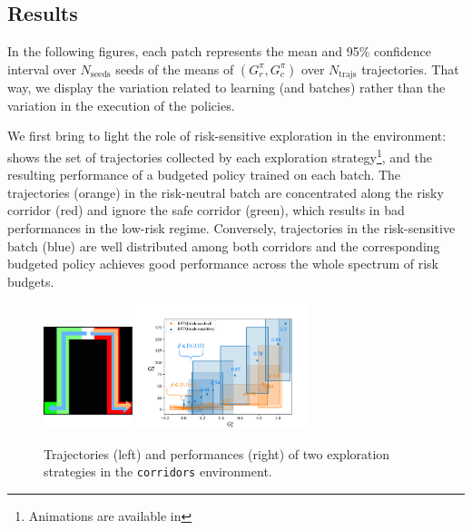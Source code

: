 \documentclass{article}
\begin{document}
\subsection{Results}
\label{subsec:results}
In the following figures, each patch represents the mean and 95\% confidence interval over $N_{\text{seeds}}$ seeds of the means of $(G_r^\pi,G_c^\pi)$ over $N_\text{trajs}$ trajectories. That way, we display the variation related to learning (and batches) rather than the variation in the execution of the policies.

We first bring to light the role of risk-sensitive exploration in the  environment:  shows the set of trajectories collected by each exploration strategy\footnote{Animations are available in }, and the resulting performance of a budgeted policy trained on each batch. The trajectories (orange) in the risk-neutral batch are concentrated along the risky corridor (red) and ignore the safe corridor (green), which results in bad performances in the low-risk regime. Conversely, trajectories in the risk-sensitive batch (blue) are well distributed among both corridors and the corresponding budgeted policy achieves good performance across the whole spectrum of risk budgets.

\begin{figure}[tp]
    \centering
    \includegraphics[width=0.23\textwidth]{source/img/test.pdf}
    \includegraphics[page=1, width=0.45\textwidth]{source/img/corridors}
    \caption{Trajectories (left) and performances (right) of two exploration strategies in the \texttt{corridors} environment. }
    \label{fig:exploration}
\end{figure}
\end{document}
